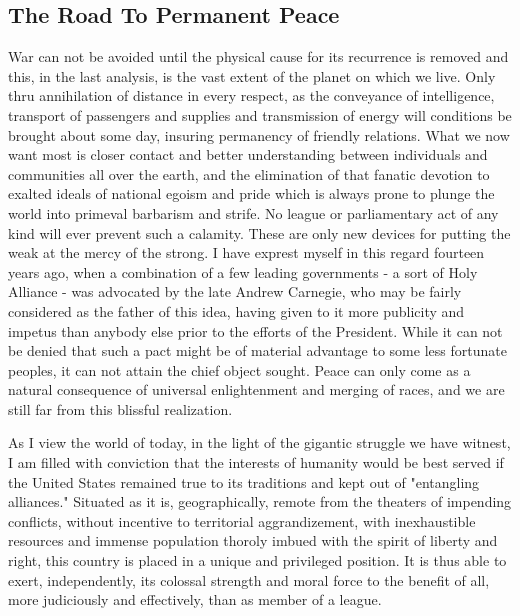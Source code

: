 \documentclass[a4paper,12pt,english,twoside,openright]{memoir}
\begin{document}
\subsection{The Road To Permanent Peace}
War can not be avoided until the physical cause for its recurrence is removed and this, in the last 
analysis, is the vast extent of the planet on which we live.  Only thru annihilation of distance in 
every respect, as the conveyance of intelligence, transport of passengers and supplies and 
transmission of energy will conditions be brought about some day, insuring permanency of 
friendly relations.  What we now want most is closer contact and better understanding between 
individuals and communities all over the earth, and the elimination of that fanatic devotion to 
exalted ideals of national egoism and pride which is always prone to plunge the world into 
primeval barbarism and strife.  No league or parliamentary act of any kind will ever prevent such 
a calamity.  These are only new devices for putting the weak at the mercy of the strong.  I have 
exprest myself in this regard fourteen years ago, when a combination of a few leading 
governments - a sort of Holy Alliance - was advocated by the late Andrew Carnegie, who may be 
fairly considered as the father of this idea, having given to it more publicity and impetus than 
anybody else prior to the efforts of the President.  While it can not be denied that such a pact 
might be of material advantage to some less fortunate peoples, it can not attain the chief object 
sought.  Peace can only come as a natural consequence of universal enlightenment and merging 
of races, and we are still far from this blissful realization.  

As I view the world of today, in the light of the gigantic struggle we have witnest, I am filled with 
conviction that the interests of humanity would be best served if the United States remained true 
to its traditions and kept out of "entangling alliances." Situated as it is, geographically, remote 
from the theaters of impending conflicts, without incentive to territorial aggrandizement, with 
inexhaustible resources and immense population thoroly imbued with the spirit of liberty and right, 
this country is placed in a unique and privileged position.  It is thus able to exert, independently, 
its colossal strength and moral force to the benefit of all, more judiciously and effectively, than as 
member of a league.  
\end{document}
